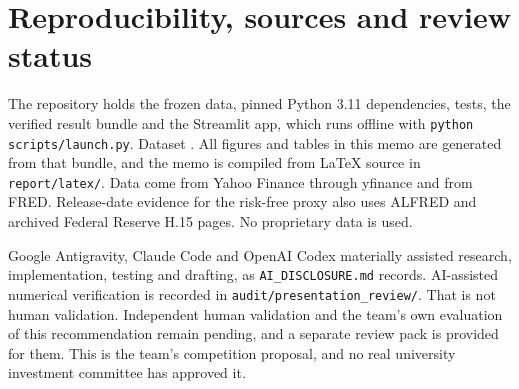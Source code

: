 \documentclass[11pt,a4paper]{article}
\begin{document}
\section{Reproducibility, sources and review status}
The repository holds the frozen data, pinned Python 3.11 dependencies, tests, the verified result bundle \qeBundle{} and the Streamlit app, which runs offline with \texttt{python scripts/launch.py}. Dataset \texttt{\qeDataset}. All figures and tables in this memo are generated from that bundle, and the memo is compiled from LaTeX source in \texttt{report/latex/}. Data come from Yahoo Finance through yfinance and from FRED. Release-date evidence for the risk-free proxy also uses ALFRED and archived Federal Reserve H.15 pages. No proprietary data is used.

Google Antigravity, Claude Code and OpenAI Codex materially assisted research, implementation, testing and drafting, as \texttt{AI\_DISCLOSURE.md} records. AI-assisted numerical verification is recorded in \texttt{audit/presentation\_review/}. That is not human validation. Independent human validation and the team's own evaluation of this recommendation remain pending, and a separate review pack is provided for them. This is the team's competition proposal, and no real university investment committee has approved it.



\end{document}
